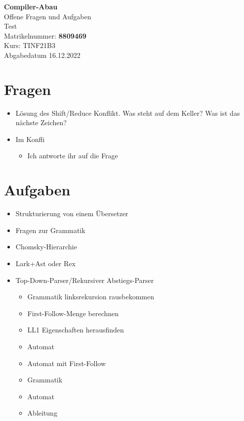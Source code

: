 \documentclass[
  ngerman
  ,12pt
  ,pdftex
]{article}
\begin{document}
\begin{titlepage}
  \begin{center}
      {\Huge \textbf{Compiler-Abau}}\\[1.5cm]
      {\Large Offene Fragen und Aufgaben}\\[1cm]
      {\Huge Test}\\[7cm]
      {\large Matrikelnummer: \textbf{8809469}}\\[0.5cm]
      {\large Kurs: TINF21B3}\\[0.5cm]
      {\large Abgabedatum 16.12.2022}
      \vfill
  \end{center}
\end{titlepage}
\newpage
\tableofcontents
\newpage
\section{Fragen}
\begin{itemize}
  \item Lösung des Shift/Reduce Konflikt. Was steht auf dem Keller? Was ist das nächste Zeichen?
  \item Im Konfli
  \begin{itemize}
    \item []  Ich antworte ihr auf die Frage  
  \end{itemize}
\end{itemize}

\section{Aufgaben}
\begin{itemize}
  \item Strukturierung von einem Übersetzer
  \item Fragen zur Grammatik
  \item Chomsky-Hierarchie
  \item Lark+Ast oder Rex
  \item Top-Down-Parser/Rekursiver Abstiegs-Parser
  \begin{itemize}
    \item Grammatik linksrekursion rausbekommen
    \item First-Follow-Menge berechnen 
    \item LL1 Eigenschaften herausfinden
    \item Automat
    \item Automat mit First-Follow
  \end{itemize}
  \begin{itemize}
    \item Grammatik 
    \item Automat
    \item Ableitung
  \end{itemize}
  
\end{itemize}
\end{document}
